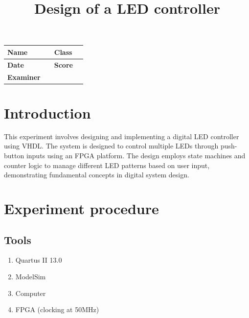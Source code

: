 \documentclass[]{article}
\begin{document}
\title{\huge Design of a LED controller}
\author{\large }
\date{}

\maketitle

\vspace{3cm}

\begin{center}
    {\large
        \begin{tabular}{|p{2.5cm}|p{3.5cm}|p{2.5cm}|p{3.5cm}|}
            \hline
            \textbf{Name}     &  & \textbf{Class} &       \\[0.8cm]
            \hline
            \textbf{Date}     &  & \textbf{Score} & \quad \\[0.8cm]
            \hline
            \textbf{Examiner} &  & \quad          & \quad \\[0.8cm]
            \hline
        \end{tabular}
    }
\end{center}

\newpage
\tableofcontents
\newpage
\newpage

\section{Introduction}
This experiment involves designing and implementing a digital LED controller using VHDL. The system is designed to control multiple LEDs through push-button inputs using an FPGA platform. The design employs state machines and counter logic to manage different LED patterns based on user input, demonstrating fundamental concepts in digital system design.

\section{Experiment procedure}

\subsection{Tools}
\begin{enumerate}[label = (\arabic*)]
    \item  Quartus II 13.0
    \item ModelSim
    \item Computer
    \item FPGA (clocking at 50MHz)
\end{enumerate}
\end{document}

